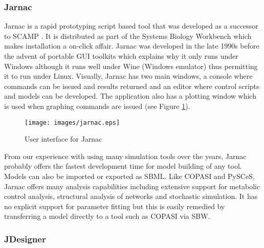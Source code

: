 \subsubsection{Jarnac}

Jarnac \autocite{sauro:2000} \autocite{bergmann2006sbw} is a rapid
prototyping script based tool that was developed as a successor to SCAMP
\autocite{SauroF91}. It is distributed as part of the Systems Biology
Workbench which makes installation a on-click affair. Jarnac was
developed in the late 1990s before the advent of portable GUI toolkits
which explains why it only runs under Windows although it runs well
under Wine (Windows emulator) thus permitting it to run under Linux.
Visually, Jarnac has two main windows, a console where commands can be
issued and results returned and an editor where control scripts and
models can be developed. The application also has a plotting window
which is used when graphing commands are issued (see Figure
\ref{Figure:jarnac}).

\begin{figure}[htbp]
\centering
\texttt{[image: images/jarnac.eps]}
\caption{User interface for Jarnac\label{Figure:jarnac}}
\end{figure}

From our experience with using many simulation tools over the years,
Jarnac probably offers the fastest development time for model building
of any tool. Models can also be imported or exported as SBML. Like
COPASI and PySCeS, Jarnac offers many analysis capabilities including
extensive support for metabolic control analysis, structural analysis of
networks and stochastic simulation. It has no explicit support for
parameter fitting but this is easily remedied by transferring a model
directly to a tool such as COPASI via SBW.

\subsubsection{JDesigner}

